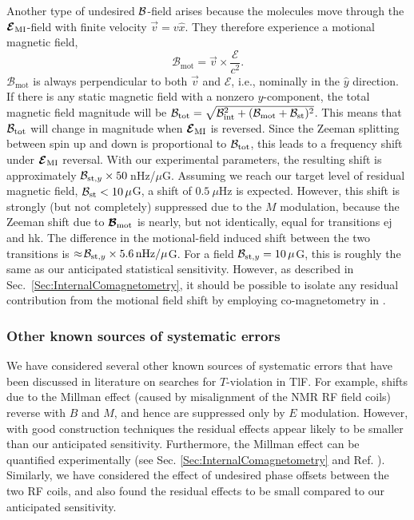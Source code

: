 Another type of undesired $\mathcal{B}$-field arises because the molecules move through the $\bm{\mathcal{E}}_\mathrm{MI}$-field with finite velocity $\vec{v} =  v\hat{x}$. They therefore experience a motional magnetic field,
\begin{equation}
    \bm{\mathcal{B}}_\mathrm{mot} = \vec{v}\times\frac{\bm{\mathcal{E}}}{c^2}.
\end{equation}
$\bm{\mathcal{B}}_\mathrm{mot}$ is always perpendicular to both $\vec{v}$ and $\bm{\mathcal{E}}$, i.e., nominally in the $\hat{y}$ direction. If there is any static magnetic field with a nonzero $y$-component, the total magnetic field magnitude will be $\mathcal{B}_\text{tot} = \sqrt{\mathcal{B}_\text{int}^2 + (\mathcal{B}_\mathrm{mot} +\mathcal{B}_\mathrm{st})^2}$.  This means that $\mathcal{B}_\mathrm{tot}$ will change in magnitude when $\bm{\mathcal{E}}_\mathrm{MI}$ is reversed. Since the Zeeman splitting between spin up and down is proportional to $\mathcal{B}_\text{tot}$, this leads to a frequency shift under $\bm{\mathcal{E}}_\mathrm{MI}$ reversal. With our experimental parameters, the resulting shift is approximately $\mathcal{B}_{\mathrm{st},y} \times 50\,$nHz/$\mu$G. Assuming we reach our target level of residual magnetic field, $\mathcal{B}_\mathrm{st} < 10\,\mu$G, a shift of $0.5~\mu$Hz is expected. However, this shift is strongly (but not completely) suppressed due to the $M$ modulation, because the Zeeman shift due to $\bm{\mathcal{B}}_\mathrm{mot}$ is nearly, but not identically, equal for transitions ej and hk. The difference in the motional-field induced shift between the two transitions is $\approx\! \mathcal{B}_{\mathrm{st},y} \times 5.6\,\mathrm{nHz}/\mu$G. For a field $\mathcal{B}_{\mathrm{st},y} = 10\,\mu$G, this is roughly the same as our anticipated statistical sensitivity.  However, as described in Sec.\ \ref{Sec:InternalComagnetometry}, it should be possible to isolate any residual contribution from the motional field shift by employing co-magnetometry in \CENTREX. 

\subsubsection{Other known sources of systematic errors}
We have considered several other known sources of systematic errors that have been discussed in literature on searches for $T$-violation in TlF.  For example, shifts due to the Millman effect \cite{millman1939determination} (caused by misalignment of the NMR RF field coils) reverse with $B$ and $M$, and hence are suppressed only by $E$ modulation. However, with good construction techniques the residual effects appear likely to be smaller than our anticipated sensitivity.
Furthermore, the Millman effect can be quantified experimentally (see Sec. \ref{Sec:InternalComagnetometry} and Ref. \cite{cho1991search}).
Similarly, we have considered the effect of undesired phase offsets between the two RF coils, and also found the residual effects to be small compared to our anticipated sensitivity.

